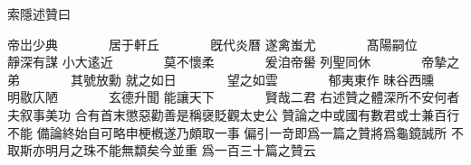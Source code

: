 索隱述贊曰

\startshuzan
帝岀少典　　　　居于軒丘　　　　旣代炎曆
遂禽蚩尤　　　　髙陽嗣位　　　　靜深有謀
小大逺近　　　　莫不懷柔　　　　爰洎帝嚳
列聖同休　　　　帝摯之弟　　　　其號放勳
就之如日　　　　望之如雲　　　　郁夷東作
昧谷西曛　　　　明敭庂陋　　　　玄德升聞
能讓天下　　　　賢哉二君
\stopshuzan
\startnarrower[2*left]
右述贊之體深所不安何者夫叙事美功%
合有首末懲惡勸善是稱襃貶觀太史公%
贊論之中或國有數君或士兼百行不能%
備論終始自可略申梗槪遂乃頗取一事%
偏引一竒即爲一篇之贊將爲龜鏡誠所%
不取斯亦明月之珠不能無纇矣今並重%
爲一百三十篇之贊云%
\stopnarrower

